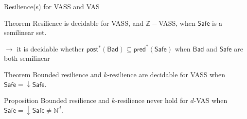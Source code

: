 \documentclass{beamer}
\newcommand{\N}{\mathbb{N}}
\newcommand{\pred}{\textsf{pred}}
\newcommand{\post}{\textsf{post}}
\newcommand{\Bad}{\textsf{Bad}}
\newcommand{\Safe}{\textsf{Safe}}
\begin{document}
  \begin{frame}{Resilience(s) for VASS and VAS}

\begin{block}{Theorem}
{\sc Resilience} is decidable for VASS, and $\mathbb{Z}-$VASS, when $\Safe$  is a semilinear set.
\end{block}


$\to$ it is decidable whether $\post^*(\Bad) \subseteq \pred^*(\Safe)$ when 
$\Bad$ and $\Safe$ are both semilinear~\cite{DBLP:journals/corr/abs-2207-02697}

\pause 

\begin{block}{Theorem}
{\sc Bounded resilience} and {\sc $k$-resilience } are decidable for VASS when 
$\Safe = \mathop{\downarrow} \Safe$.
\end{block}

 
\pause

\begin{block}{Proposition}
{\sc Bounded resilience} and {\sc $k$-resilience} never hold for $d$-VAS when $\Safe = \mathop{\downarrow} \Safe \neq \N^d$.
\end{block}





  \end{frame}
\end{document}

